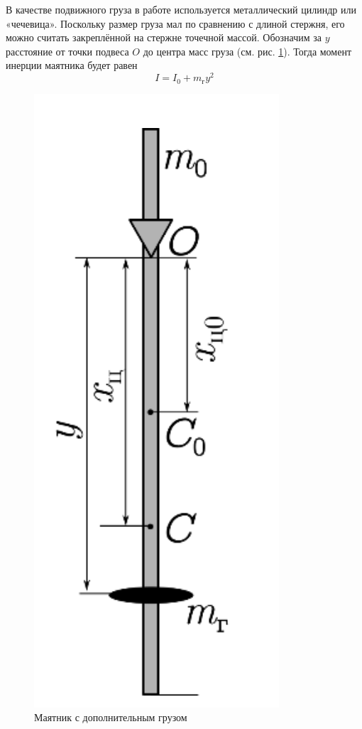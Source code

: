 \documentclass[12pt]{article}
\begin{document}
	В качестве подвижного груза в работе используется металлический цилиндр или «чечевица». Поскольку размер груза мал по сравнению с длиной стержня, его можно считать закреплённой на стержне точечной массой. Обозначим за $y$ расстояние от точки подвеса $O$ до центра масс груза (см. рис. \ref{inertion}). Тогда момент инерции маятника будет равен
	$$
	I = I_0 + m_{\text{г}}y^2
	$$
	\begin{figure}
		\includegraphics[width=\linewidth]{inertion}
		\caption{Маятник с дополнительным грузом}
		\label{inertion}	
	\end{figure}
\end{document}
